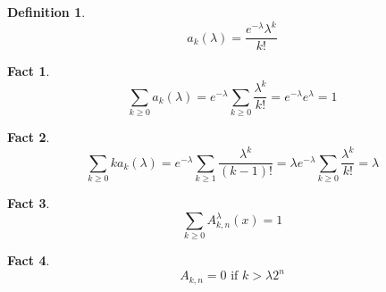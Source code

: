\documentclass[11pt,a4paper]{tesis}
\newtheorem{fact}{Fact}[]
\newtheorem{definition}{Definition}[]
\newcommand{\note}[1]{\textbf{\color{red}{#1}}}
\begin{document}
\begin{definition} 
   $$a_k(\lambda) = \frac{e^{-\lambda}\lambda^k}{k!}$$
\end{definition}


\begin{fact}
    $$\sum_{k \geq 0} a_k(\lambda) = e^{-\lambda}\sum_{k \geq 0} \frac{\lambda^k}{k!} = e^{-\lambda}e^{\lambda} = 1$$
\end{fact}

\begin{fact}
    $$\sum_{k \geq 0} ka_k(\lambda) = e^{-\lambda}\sum_{k \geq 1} \frac{\lambda^k}{(k-1)!} = \lambda e^{-\lambda} \sum_{k \geq 0} \frac{\lambda^k}{k!}= \lambda$$
\end{fact}





\begin{fact}
    $$\sum_{k \geq 0} A^{\lambda}_{k,n}(x) = 1$$
\end{fact}

\begin{fact}
    $$A_{k,n} = 0 \textrm{ if } k > \lambda2^n$$
\end{fact}





\end{document}
